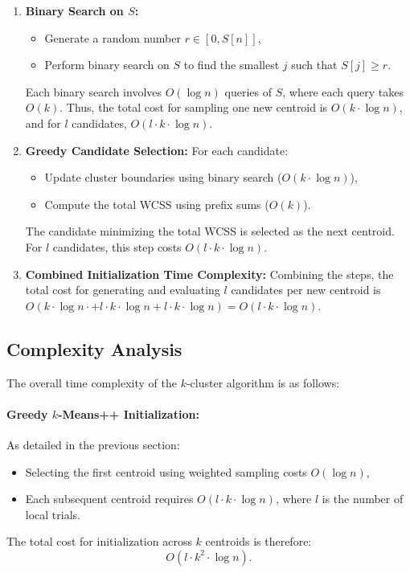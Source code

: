 \begin{enumerate}
\begin{enumerate}
        \item \textbf{Binary Search on \(S\):}
        \begin{itemize}
            \item Generate a random number \(r \in [0, S[n]]\),
            \item Perform binary search on \(S\) to find the smallest \(j\) such that \(S[j] \geq r\).
        \end{itemize}
        Each binary search involves \(O(\log n)\) queries of \(S\), where each query takes \(O(k)\). Thus, the total cost for sampling one new centroid is \(O(k \cdot \log n)\), and for $l$ candidates, $O(l \cdot k \cdot \log n)$.

        \item \textbf{Greedy Candidate Selection:}
        For each candidate:
        \begin{itemize}
            \item Update cluster boundaries using binary search (\(O(k \cdot \log n)\)),
            \item Compute the total WCSS using prefix sums (\(O(k)\)).
        \end{itemize}
        The candidate minimizing the total WCSS is selected as the next centroid. For \(l\) candidates, this step costs \(O(l \cdot k \cdot \log n)\).

        \item \textbf{Combined Initialization Time Complexity:}
        Combining the steps, the total cost for generating and evaluating \(l\) candidates per new centroid is $O(k \cdot \log n \cdot + l \cdot k \cdot \log n + l \cdot k \cdot \log n) = O(l \cdot k \cdot \log n)$.
    \end{enumerate}
\end{enumerate}

\subsection{Complexity Analysis}

The overall time complexity of the \(k\)-cluster algorithm is as follows:

\paragraph{Greedy $k$-Means++ Initialization:}
As detailed in the previous section:
\begin{itemize}
    \item Selecting the first centroid using weighted sampling costs \(O(\log n)\),
    \item Each subsequent centroid requires \(O(l \cdot k \cdot \log n)\), where \(l\) is the number of local trials.
\end{itemize}
The total cost for initialization across \(k\) centroids is therefore:
\[
O(l \cdot k^2 \cdot \log n).
\]

